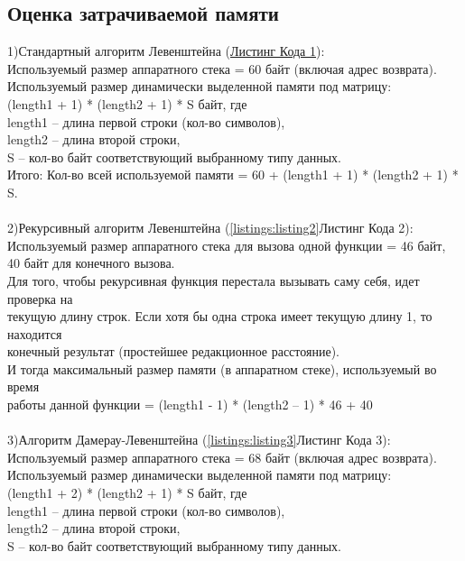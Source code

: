 \subsection{Оценка затрачиваемой памяти}
1)Стандартный алгоритм Левенштейна (\hyperref[listings:listing1]{Листинг Кода 1}): \\
Используемый размер аппаратного стека = 60 байт (включая адрес возврата). \\
Используемый размер динамически выделенной памяти под матрицу: \\
(length1 + 1) * (length2 + 1) * S байт, где \\
length1 – длина первой строки (кол-во символов), \\
length2 – длина второй строки, \\
S – кол-во байт соответствующий выбранному типу данных. \\
Итого: Кол-во всей используемой памяти = 60 + (length1 + 1) * (length2 + 1) * S. \\
\\
2)Рекурсивный алгоритм Левенштейна (\ref{listings:listing2}Листинг Кода 2): \\
Используемый размер аппаратного стека для вызова одной функции = 46 байт, \\
40 байт для конечного вызова. \\
Для того, чтобы рекурсивная функция перестала вызывать саму себя, идет проверка на \\
текущую длину строк. Если хотя бы одна строка имеет текущую длину 1, то находится \\
конечный результат (простейшее редакционное расстояние). \\
И тогда максимальный размер памяти (в аппаратном стеке), используемый во время \\
работы данной функции = (length1 - 1) * (length2 – 1) * 46 + 40 \\
\\
3)Алгоритм Дамерау-Левенштейна (\ref{listings:listing3}Листинг Кода 3): \\
Используемый размер аппаратного стека = 68 байт (включая адрес возврата). \\
Используемый размер динамически выделенной памяти под матрицу: \\
(length1 + 2) * (length2 + 1) * S байт, где \\
length1 – длина первой строки (кол-во символов), \\
length2 – длина второй строки, \\
S – кол-во байт соответствующий выбранному типу данных. \\
